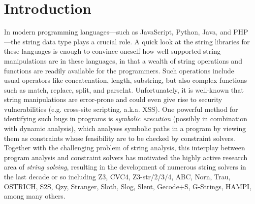 
\section{Introduction}\label{sec-intro}



%
In modern programming languages---such as JavaScript, Python, Java, and PHP---the string data type plays a crucial role. 
A quick look at the string libraries for these languages is enough to convince
oneself how well supported string manipulations are in these languages, in that
a wealth of string operations and functions are readily available for the
programmers.
Such operations include usual operators like concatenation, length, substring, 
but also complex functions such as 
match, replace, split, and parseInt.
Unfortunately, it is well-known that string manipulations are error-prone and
could even give rise to
security vulnerabilities (e.g. cross-site scripting, a.k.a. XSS).
One powerful method for identifying such bugs in programs is \emph{symbolic 
execution} (possibly in combination with dynamic analysis), which
analyses symbolic paths in a program by viewing them as constraints %
whose feasibility are to be checked by constraint solvers. 
Together with the challenging problem of string analysis,
this interplay between program analysis and constraint solvers has motivated 
the highly active research area of \emph{string solving}, resulting in the
development of numerous string solvers in the last decade or so including
Z3, CVC4, Z3-str/2/3/4, ABC, Norn, Trau, OSTRICH, S2S, Qzy, Stranger, Sloth,
Slog, Slent, Gecode+S, G-Strings, HAMPI, among many others. %

